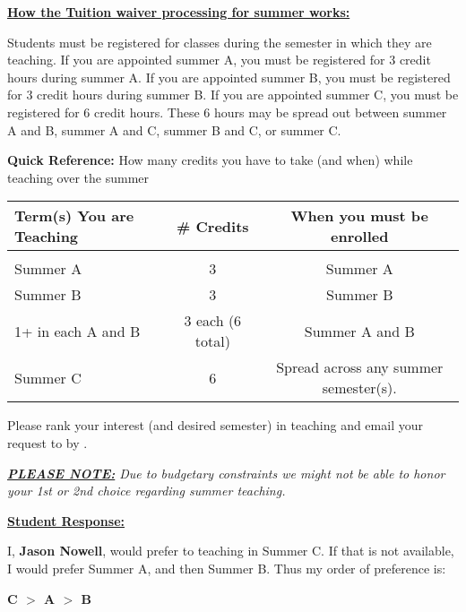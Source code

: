 \documentclass{article}
\newcommand{\choice}[4]{


    I, \textbf{#1}, would prefer to teaching in Summer #2. If that is not available, I would prefer Summer #3, and then Summer #4. Thus my order of preference is:

    \textbf{#2 $>$ #3 $>$ #4}
}
\newcommand{\nochoice}[1]{
    I, \textbf{#1}, \textbf{request no teaching assignment}. I also realize this means I will have no tuition wavier if I decide to enroll in summer courses, and I will also not be receiving a stipend (for teaching duties) during this summer. This does not necessarily impact any scholarships or non-teaching stipends I might otherwise receive.
}
\begin{document}
\vspace{15pt}

\large{\underline{\textbf{How the Tuition waiver processing for summer works:}}}

Students must be registered for classes during the semester in which they are teaching. If you are appointed summer A, you must be registered for 3 credit hours during summer A. If you are appointed summer B, you must be registered for 3 credit hours during summer B. If you are appointed summer C, you must be registered for 6 credit hours. These 6 hours may be spread out between summer A and B, summer A and C, summer B and C, or summer C.

\vspace{10pt}

\textbf{\large{Quick Reference:}} How many credits you have to take (and when) while teaching over the summer

\vspace{10pt}

\begin{tabular}{lcc}
\textbf{Term(s) You are Teaching} & \textbf{\# Credits } & \textbf{When you must be enrolled} \\\hline &&\\
Summer A & 3 & Summer A\\
Summer B & 3 & Summer B\\
1+ in each A and B & 3 each (6 total) & Summer A and B\\
Summer C & 6 & Spread across any summer semester(s).\\
\end{tabular}

Please rank your interest (and desired semester) in teaching and email your request to \dueRecipient by \dueDate.

\textit{\underline{\textbf{PLEASE NOTE:}} Due to budgetary constraints we might not be able to honor your 1st or
2nd choice regarding summer teaching.}

\large{ \textbf{\underline{Student Response:}}}



\choice{Jason Nowell}{C}{A}{B}
\end{document}
